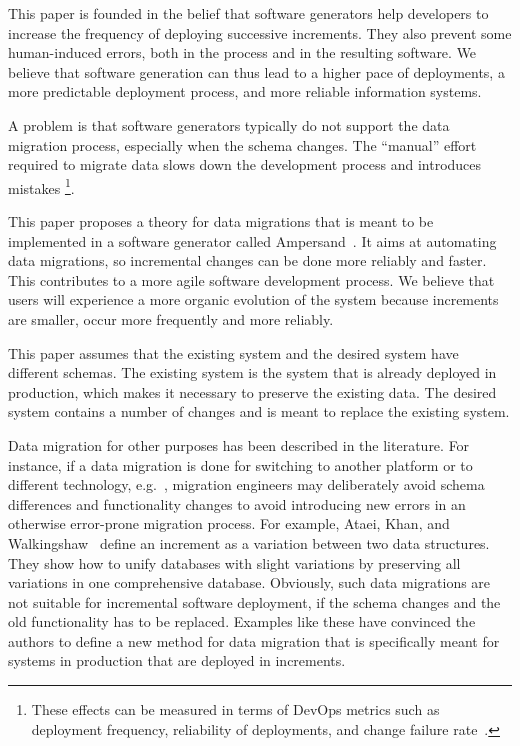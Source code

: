 \documentclass{elsarticle}
\begin{document}
   This paper is founded in the belief that software generators help developers to increase the frequency of deploying successive increments.
   They also prevent some human-induced errors, both in the process and in the resulting software.
   We believe that software generation can thus lead to a higher pace of deployments, a more predictable deployment process, and more reliable information systems.

   A problem is that software generators typically do not support the data migration process, especially when the schema changes.
   The ``manual'' effort required to migrate data slows down the development process and introduces mistakes%
\footnote{These effects can be measured in terms of DevOps metrics such as
   deployment frequency,
   reliability of deployments, and
   change failure rate~\cite{DevOps2021}.}.

   This paper proposes a theory for data migrations that is meant to be implemented in a software generator called Ampersand~\cite{JoostenRAMiCS2017, Joosten-JLAMP2018}.
   It aims at automating data migrations, so incremental changes can be done more reliably and faster.
   This contributes to a more agile software development process.
   We believe that users will experience a more organic evolution of the system because increments are smaller, occur more frequently and more reliably.
   
   This paper assumes that the existing system and the desired system have different schemas.
   The existing system is the system that is already deployed in production,
   which makes it necessary to preserve the existing data.
   The desired system contains a number of changes and is meant to replace the existing system.

   Data migration for other purposes has been described in the literature.
   For instance, if a data migration is done for switching to another platform or to different technology,
   e.g.~\cite{Gholami2016,Bisbal1999},
   migration engineers may deliberately avoid schema differences and functionality changes to avoid introducing new errors in an otherwise error-prone migration process.
   For example, Ataei, Khan, and Walkingshaw~\cite{Ataei2021,Walkingshaw2014} define an increment as a variation between two data structures.
   They show how to unify databases with slight variations by preserving all variations in one comprehensive database.
   Obviously, such data migrations are not suitable for incremental software deployment,
   if the schema changes and the old functionality has to be replaced.
   Examples like these have convinced the authors to define a new method for data migration that is specifically meant for systems in production that are
   deployed in increments.
   
\end{document}
